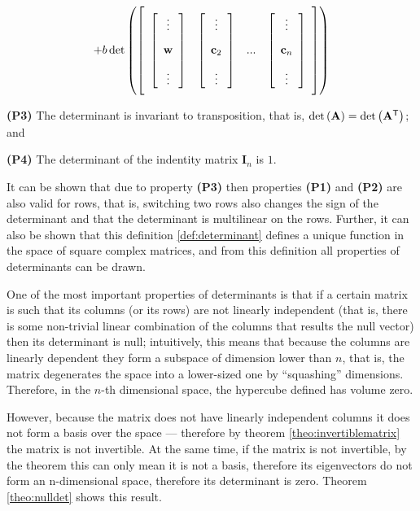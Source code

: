 \begin{definition}
\begin{gather}
	+ b\det\left(\left[\raisebox{15mm}{} \begin{array}{cccc} \left[\begin{array}{c} \vdots \\[3mm] \mathbf{w} \\[3mm] \vdots \end{array}\right] & \left[\begin{array}{c} \vdots \\[3mm] \mathbf{c}_2 \\[3mm] \vdots \end{array}\right] & ... & \left[\begin{array}{c} \vdots \\[3mm] \mathbf{c}_n \\[3mm] \vdots \end{array}\right]\end{array}\right]\right) 
\end{gather}

\noindent\textbf{(P3)} The determinant is invariant to transposition, that is, $\det\left(\mathbf{A}\right) = \det\left(\mathbf{A}^{\mathsf{T}}\right)$; and

\noindent\textbf{(P4)} The determinant of the indentity matrix $\mathbf{I}_n$ is $1$.
\end{definition}

	It can be shown that due to property \textbf{(P3)} then properties \textbf{(P1)} and \textbf{(P2)} are also valid for rows, that is, switching two rows also changes the sign of the determinant and that the determinant is multilinear on the rows. Further, it can also be shown that this definition \ref{def:determinant} defines a unique function in the space of square complex matrices, and from this definition all properties of determinants can be drawn.

	One of the most important properties of determinants is that if a certain matrix is such that its columns (or its rows) are not linearly independent (that is, there is some non-trivial linear combination of the columns that results the null vector) then its determinant is null; intuitively, this means that because the columns are linearly dependent they form a subspace of dimension lower than $n$, that is, the matrix degenerates the space into a lower-sized one by ``squashing'' dimensions. Therefore, in the $n$-th dimensional space, the hypercube defined has volume zero.

	However, because the matrix does not have linearly independent columns it does not form a basis over the space — therefore by theorem \ref{theo:invertiblematrix} the matrix is not invertible. At the same time, if the matrix is not invertible, by the theorem this can only mean it is not a basis, therefore its eigenvectors do not form an n-dimensional space, therefore its determinant is zero. Theorem \ref{theo:nulldet} shows this result.

